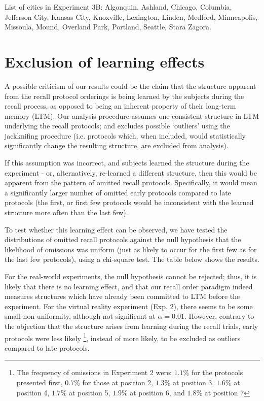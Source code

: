 \normalsize

List of cities in Experiment 3B: \footnotesize{Algonquin, Ashland, Chicago, Columbia, Jefferson City, Kansas City, Knoxville, Lexington, Linden, Medford, Minneapolis, Missoula, Mound, Overland Park, Portland, Seattle, Stara Zagora}.

\normalsize

\section{Exclusion of learning effects}

A possible criticism of our results could be the claim that the structure apparent from the recall protocol orderings is being learned by the subjects during the recall process, as opposed to being an inherent property of their long-term memory (LTM). Our analysis procedure assumes one consistent structure in LTM underlying the recall protocols; and excludes possible `outliers' using the jackknifing procedure (i.e. protocols which, when included, would statistically significantly change the resulting structure, are excluded from analysis).

If this assumption was incorrect, and subjects learned the structure during the experiment - or, alternatively, re-learned a different structure, then this would be apparent from the pattern of omitted recall protocols. Specifically, it would mean a significantly larger number of omitted early protocols compared to late protocols (the first, or first few protocols would be inconsistent with the learned structure more often than the last few).

To test whether this learning effect can be observed, we have tested the distributions of omitted recall protocols against the null hypothesis that the likelihood of omissions was uniform (just as likely to occur for the first few as for the last few protocols), using a chi-square test. The table below shows the results. 

For the real-world experiments, the null hypothesis cannot be rejected; thus, it is likely that there is no learning effect, and that our recall order paradigm indeed measures structures which have already been committed to LTM before the experiment. For the virtual reality experiment (Exp. 2), there seems to be some small non-uniformity, although not significant at $\alpha=0.01$. However, contrary to the objection that the structure arises from learning during the recall trials, early protocols were less likely \footnote{The frequency of omissions in Experiment 2 were: $1.1\%$ for the protocols presented first, $0.7 \%$ for those at position 2, $1.3\%$ at position 3, $1.6\%$ at position 4, $1.7\%$ at position 5, $1.9\%$ at position 6, and $1.8\%$ at position 7}, instead of more likely, to be excluded as outliers compared to late protocols. 

